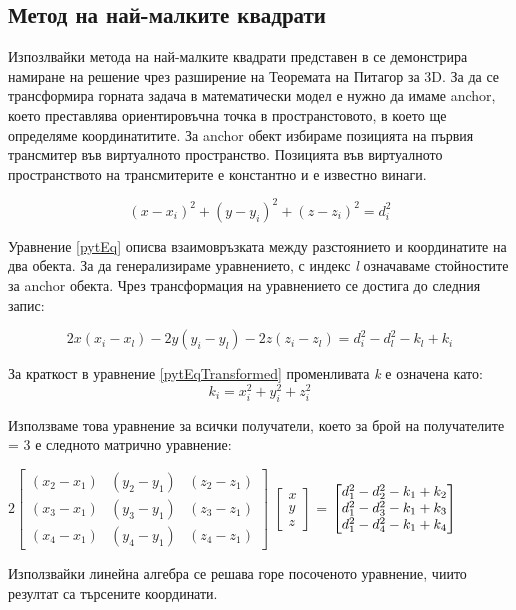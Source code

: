 \subsection{Метод на най-малките квадрати} \label{squares_algorithm}

Изпозлвайки метода на най-малките квадрати представен в \cite{leastsq} се демонстрира намиране на решение чрез разширение на Теоремата на Питагор за 3D. За да се трансформира горната задача в математически модел е нужно да имаме anchor\cite{leastsq2}, което преставлява ориентировъчна точка в пространстовото, в което ще определяме координатитите. За anchor обект избираме позицията на първия трансмитер във виртуалното пространство. Позицията във виртуалното пространството на трансмитерите е константно и е известно винаги.


\begin{equation} \label{pytEq}
   (x-x_i)^2 + (y-y_i)^2 + (z-z_i)^2=d_i^2
\end{equation}

Уравнение \ref{pytEq} описва взаимовръзката между разстоянието и координатите на два обекта. За да генерализираме уравнението, с индекс \textit{l} означаваме стойностите за anchor обекта. Чрез трансформация на уравнението се достига до следния запис:

\begin{equation} \label{pytEqTransformed}
  2 x (x_i - x_l) - 2 y (y_i - y_l) - 2  z  (z_i - z_l) = d^2_i - d^2_l - k_l + k_i
\end{equation}

За краткост в уравнение \ref{pytEqTransformed} променливата \textit{k} е означена като: 
\begin{equation} \label{kdesc}
    k_i= x^2_i + y^2_i + z^2_i
\end{equation}

Използваме това уравнение за всички получатели, което за брой на получателите = 3 е следното матрично уравнение:

\centerline{
    $
    2 \begin{bmatrix}
        (x_2-x_1) & (y_2 - y_1) & (z_2 - z_1)\\
        (x_3-x_1) & (y_3 - y_1) & (z_3 - z_1)\\
        (x_4-x_1) & (y_4 - y_1) & (z_4 - z_1)
    \end{bmatrix}
    $
    $
    \begin{bmatrix}
        x\\y\\z
    \end{bmatrix}
    $
    =
    $
    \begin{bmatrix}
        d^2_1 - d^2_2 - k_1 + k_2\\
        d^2_1 - d^2_3 - k_1 + k_3\\
        d^2_1 - d^2_4 - k_1 + k_4\\
    \end{bmatrix}\\
    $
}

Използвайки линейна алгебра се решава горе посоченото уравнение, чиито резултат са търсените координати.
